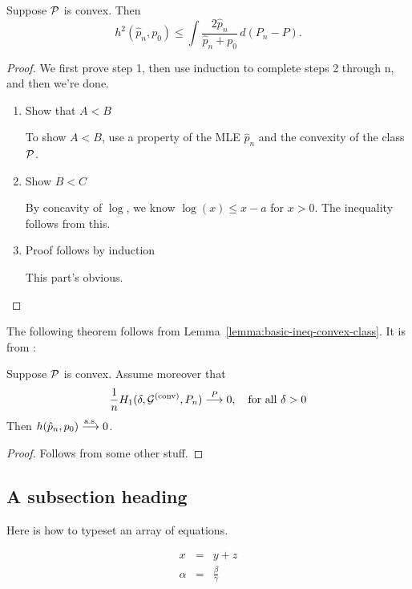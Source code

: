 \documentclass[twoside]{article}
\begin{document}
\begin{lemma}\label{lemma:basic-ineq-convex-class}
  \citep[Lemma 4.5, p.~51]{geer} Suppose $\mathcal{P}$ is convex.  Then
  $$
  h^2(\hat{p}_n,p_0) \le \int \frac{2\hat{p}_n}{\hat{p}_n+p_0}\,d(P_n-P).
  $$
\end{lemma}
\begin{proof}
  We first prove step 1, then use induction to complete steps 2
  through n, and then we're done.
  \begin{enumerate} 
  \item Show that $A<B$

    To show $A<B$, use a property of the MLE $\hat{p}_n$ and the
    convexity of the class $\mathcal{P}$.

  \item Show $B<C$
    
    By concavity of $\log$, we know $\log(x) \le x-a$ for $x>0$.  The inequality follows from this.
    
  \item Proof follows by induction

    This part's obvious.
  \end{enumerate}
  
\end{proof}

The following theorem follows from
Lemma~\ref{lemma:basic-ineq-convex-class}. It is from \citet[Thm 4.6, p.~51]{geer}:

\begin{theorem}
\label{thm:mle-convex-class}
  Suppose $\mathcal{P}$ is convex.  Assume moreover that
  $$
  \frac{1}{n} H_1(\delta,\mathcal{G}^{(\textrm{conv})},P_n) \stackrel{P}{\longrightarrow} 0, \quad \mbox{for all } \delta>0
  $$
  Then $h(\hat{p}_n,p_0) \stackrel{\textrm{a.s.}}{\longrightarrow} 0$.
\end{theorem}
\begin{proof}
  Follows from some other stuff.
\end{proof}


\subsection{A subsection heading}

Here is how to typeset an array of equations.

\begin{eqnarray}
	x & = & y + z  \label{eq:notInteresting} \\
%
     \alpha & = & \frac{\beta}{\gamma} \label{eq:interesting}
\end{eqnarray}
\end{document}

